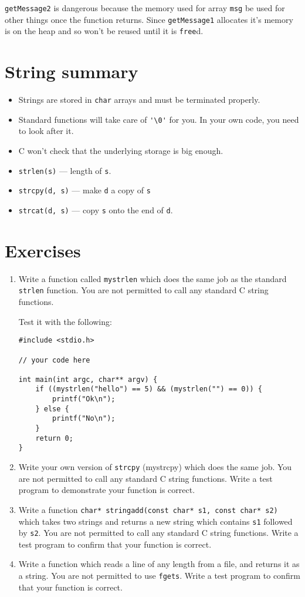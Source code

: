 \texttt{getMessage2} is dangerous because the memory used for array \texttt{msg} be used for other things once the function returns.
Since \texttt{getMessage1} allocates it's memory is on the heap and so won't be reused until it is \texttt{free}d.

\section*{String summary}
\begin{itemize}
 \item Strings are stored in \texttt{char} arrays and must be terminated properly.
 \item Standard functions will take care of \lstinline!'\0'! for you. In your own code, you need to look after it.
 \item C won't check that the underlying storage is big enough.
 \item \texttt{strlen(s)} --- length of \texttt{s}.
 \item \texttt{strcpy(d, s)} --- make \texttt{d} a copy of \texttt{s}
 \item \texttt{strcat(d, s)} --- copy \texttt{s} onto the end of \texttt{d}.
\end{itemize}

\section*{Exercises}
\begin{enumerate}
\item
Write a function called \texttt{mystrlen} which does the same job as the standard \texttt{strlen} function.
You are not permitted to call any standard C string functions.

Test it with the following:
\begin{lstlisting}[numbers=none]
#include <stdio.h>

// your code here

int main(int argc, char** argv) {
    if ((mystrlen("hello") == 5) && (mystrlen("") == 0)) {
        printf("Ok\n");
    } else {
        printf("No\n");
    }
    return 0;
}
\end{lstlisting}

\item Write your own version of \texttt{strcpy} (mystrcpy) which does the same job.
You are not permitted to call any standard C string functions.
Write a test program to demonstrate your function is correct.

\item Write a function \lstinline!char* stringadd(const char* s1, const char* s2)! which takes two strings and 
returns a new string which contains \texttt{s1} followed by \texttt{s2}.
You are not permitted to call any standard C string functions.
Write a test program to confirm that your function is correct.

\item Write a function which reads a line of any length from a file, and returns it as a string.
You are not permitted to use \texttt{fgets}.
Write a test program to confirm that your function is correct.
 
\end{enumerate}
